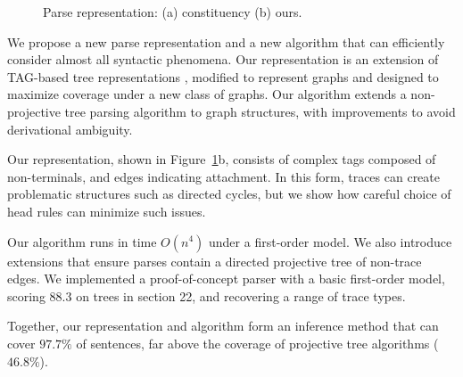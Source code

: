 \begin{figure}
  \centering
  \scalebox{0.65}{
  
  }
  \vspace{-5mm}
  \caption{\label{fig:repr}
    Parse representation: (a) constituency (b) ours.
  }
\end{figure}

We propose a new parse representation and a new algorithm that can efficiently consider almost all syntactic phenomena.
Our representation is an extension of TAG-based tree representations \cite{cck,Shen:2007}, modified to represent graphs and designed to maximize coverage under a new class of graphs.
Our algorithm extends a non-projective tree parsing algorithm \cite{ec} to graph structures, with improvements to avoid derivational ambiguity.

Our representation, shown in Figure~\ref{fig:repr}b, consists of complex tags composed of non-terminals, and edges indicating attachment.
In this form, traces can create problematic structures such as directed cycles, but we show how careful choice of head rules can minimize such issues.

Our algorithm runs in time $O(n^4)$ under a first-order model.
We also introduce extensions that ensure parses contain a directed projective tree of non-trace edges.
We implemented a proof-of-concept parser with a basic first-order model, scoring $88.3$ on trees in section 22, and recovering a range of trace types.

Together, our representation and algorithm form an inference method that can cover $97.7\%$ of sentences, far above the coverage of projective tree algorithms ($46.8\%$).
